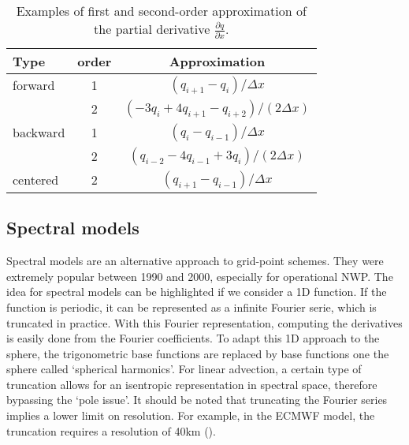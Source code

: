 \begin{table}
  \centering
  \caption{Examples of first and second-order approximation of the partial
    derivative $\frac{\partial q}{\partial x}$.}
\label{tab:derivatives}
  \begin{tabular}{lcc}
    \toprule
    Type & order & Approximation\\
    \midrule 
    forward & 1 & $(q_{i+1}-q_i)/\Delta x$\\
    & 2 & $(-3q_i + 4q_{i+1}-q_{i+2})/(2\Delta x)$\\
    \midrule 
    backward & 1 & $(q_{i}-q_{i-1})/\Delta x$\\
    & 2 & $(q_{i-2} - 4q_{i-1} + 3q_{i})/(2\Delta x)$\\
    \midrule 
    centered & 2 & $(q_{i+1}-q_{i-1})/\Delta x$\\
   \bottomrule
  \end{tabular}
\end{table}

\subsection{Spectral models}
Spectral models are an alternative approach to grid-point schemes.
They were extremely popular between 1990 and 2000,
especially for operational \gls{NWP}. The idea for spectral models can be
highlighted if we consider a 1D function. If the function is periodic, it can be
represented as a infinite Fourier serie, which is truncated in practice. With this
Fourier representation, computing the derivatives is easily done
from the Fourier coefficients. To adapt this 1D approach to the sphere, the
trigonometric base functions are replaced by base functions one the sphere
called `spherical harmonics'. For linear advection, a certain type of truncation
allows for an isentropic representation in spectral space, therefore bypassing
the `pole issue'. It should be noted that truncating the Fourier series implies
a lower limit on resolution. For example, in the \gls{ECMWF} model, the
truncation requires a resolution of 40km (\cite{ECMWF2001}). 

